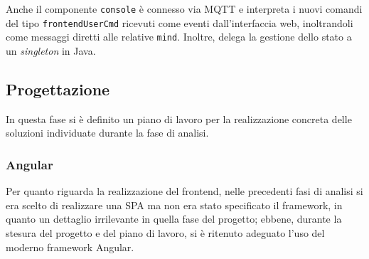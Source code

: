 % 


Anche il componente \texttt{console} è connesso via MQTT e interpreta i nuovi comandi del tipo \texttt{frontendUserCmd} ricevuti come eventi dall'interfaccia web, inoltrandoli come messaggi diretti alle relative \texttt{mind}.
Inoltre, delega la gestione dello stato a un \textit{singleton} in Java.

\subsection{Progettazione}

In questa fase si è definito un piano di lavoro per la realizzazione concreta delle soluzioni individuate durante la fase di analisi.

\subsubsection{Angular}

Per quanto riguarda la realizzazione del frontend, nelle precedenti fasi di analisi si era scelto di realizzare una SPA ma non era stato specificato il framework, in quanto un dettaglio irrilevante in quella fase del progetto;
ebbene, durante la stesura del progetto e del piano di lavoro, si è ritenuto adeguato l'uso del moderno framework Angular.

